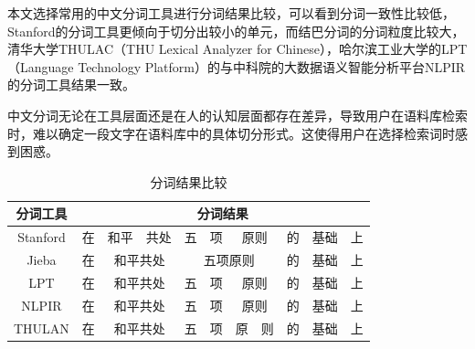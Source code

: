 \documentclass[11pt]{article}
\begin{document}
\begin{CJK*}{UTF8}{gbsn}
本文选择常用的中文分词工具进行分词结果比较，可以看到分词一致性比较低，Stanford的分词工具\cite{corenlp}更倾向于切分出较小的单元，而结巴分词的分词粒度比较大，清华大学THULAC（THU Lexical Analyzer for Chinese）\cite{li-sun-2009-punctuation}，哈尔滨工业大学的LPT（Language Technology Platform）\cite{che-etal-2021-n}的与中科院的大数据语义智能分析平台NLPIR\cite{zhanghuaping2019}的分词工具结果一致。

中文分词无论在工具层面还是在人的认知层面都存在差异，导致用户在语料库检索时，难以确定一段文字在语料库中的具体切分形式。这使得用户在选择检索词时\cite{ccl}感到困惑。


\begin{table}[h]
	\begin{center}
		\begin{tabular}{c|c|c|c|c|c|c|c|c|c|c} \hline 
			\bf 分词工具 & \multicolumn{10}{c}{\bf 分词结果} \\ \hline
			Stanford & 在  & 和平  & 共处  & 五  & 项  & \multicolumn{2}{c|}{原则}  & 的  & 基础  & 上 \\ \hline
			Jieba & 在 & \multicolumn{2}{c|}{和平共处} & \multicolumn{4}{c|}{五项原则}  & 的  & 基础  & 上 \\ \hline
			LPT & 在 & \multicolumn{2}{c|}{和平共处} & 五 & 项 & \multicolumn{2}{c|}{原则} & 的 & 基础  & 上 \\ \hline
			NLPIR & 在 & \multicolumn{2}{c|}{和平共处} & 五 & 项 & \multicolumn{2}{c|}{原则} & 的 & 基础  & 上 \\ \hline
			THULAN & 在 & \multicolumn{2}{c|}{和平共处} & 五 & 项  & 原 & 则  & 的  & 基础  & 上 \\ \hline
		\end{tabular}
	\end{center}
	\caption{\label{ccl-table} 分词结果比较}
\end{table}


\end{CJK*}
\end{document}
